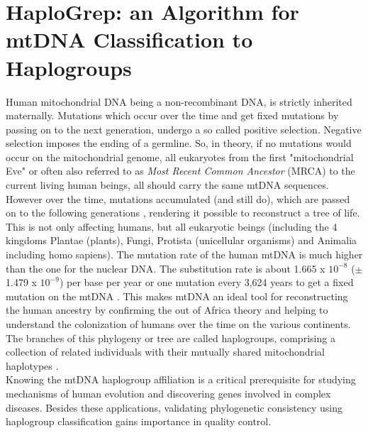 \chapter{HaploGrep: an Algorithm for mtDNA Classification to Haplogroups}
\label{chapterHaplogrep}
Human mitochondrial DNA being a non-recombinant DNA, is strictly inherited maternally. Mutations which occur over the time and get fixed mutations by passing on to the next generation, undergo a so called positive selection. Negative selection imposes the ending of a germline. So, in theory, if no mutations would occur on the mitochondrial genome, all eukaryotes from the first "mitochondrial Eve" or often also referred to as \textit{Most Recent Common Ancestor} (MRCA) to the current living human beings, all should carry the same mtDNA sequences. However over the time, mutations accumulated (and still do), which are passed on to the following generations \cite{Stewart2014}, rendering it possible to reconstruct a tree of life. This is not only affecting humans, but all eukaryotic beings (including the 4 kingdoms Plantae (plants), Fungi, Protista (unicellular organisms) and Animalia including homo sapiens). The mutation rate of the human mtDNA is much higher than the one for the nuclear DNA. The substitution rate is about 1.665 x $10^{-8}$ ($\pm$ 1.479 x $10^{-9}$) per base per year or one mutation every 3,624 years to get a fixed mutation on the mtDNA \cite{Soares2009}. This makes mtDNA an ideal tool for reconstructing the human ancestry by confirming the out of Africa theory and helping to understand the colonization of humans over the time on the various continents. The branches of this phylogeny or tree are called haplogroups, comprising a collection of related individuals with their mutually shared mitochondrial haplotypes \cite{Scally2012}. \\
Knowing the mtDNA haplogroup affiliation is a critical prerequisite \cite{Kloss-Brandstatter2011} for studying mechanisms of human evolution and discovering genes involved in complex diseases. Besides these applications, validating phylogenetic consistency using haplogroup classification gains importance in quality control. 

